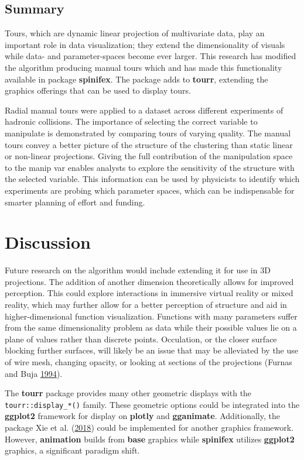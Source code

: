 \hypertarget{summary}{%
\subsection{Summary}\label{summary}}

Tours, which are dynamic linear projection of multivariate data, play an
important role in data visualization; they extend the dimensionality of
visuals while data- and parameter-spaces become ever larger. This
research has modified the algorithm producing manual tours which and has
made this functionality available in package \textbf{spinifex}. The
package adds to \textbf{tourr}, extending the graphics offerings that
can be used to display tours.

Radial manual tours were applied to a dataset across different
experiments of hadronic collisions. The importance of selecting the
correct variable to manipulate is demonstrated by comparing tours of
varying quality. The manual tours convey a better picture of the
structure of the clustering than static linear or non-linear
projections. Giving the full contribution of the manipulation space to
the manip var enables analysts to explore the sensitivity of the
structure with the selected variable. This information can be used by
physicists to identify which experiments are probing which parameter
spaces, which can be indispensable for smarter planning of effort and
funding.

\hypertarget{sec:discussion}{%
\section{Discussion}\label{sec:discussion}}

Future research on the algorithm would include extending it for use in
3D projections. The addition of another dimension theoretically allows
for improved perception. This could explore interactions in immersive
virtual reality or mixed reality, which may further allow for a better
perception of structure and aid in higher-dimensional function
visualization. Functions with many parameters suffer from the same
dimensionality problem as data while their possible values lie on a
plane of values rather than discrete points. Occulation, or the closer
surface blocking further surfaces, will likely be an issue that may be
alleviated by the use of wire mesh, changing opacity, or looking at
sections of the projections (Furnas and Buja
\protect\hyperlink{ref-furnas_prosection_1994}{1994}).

The \textbf{tourr} package provides many other geometric displays with
the \texttt{tourr::display\_*()} family. These geometric options could
be integrated into the \textbf{ggplot2} framework for display on
\textbf{plotly} and \textbf{gganimate}. Additionally, the
 package Xie et al.
(\protect\hyperlink{ref-xie_animation:_2018}{2018}) could be implemented
for another graphics framework. However, \textbf{animation} builds from
\textbf{base} graphics while \textbf{spinifex} utilizes \textbf{ggplot2}
graphics, a significant paradigm shift.

